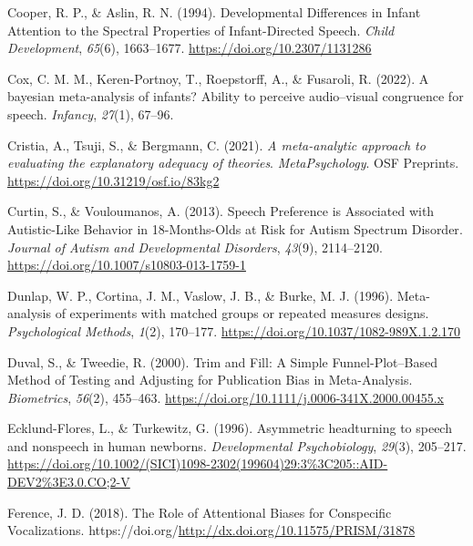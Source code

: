 \documentclass[
  man,mask,floatsintext]{apa6}
\newlength{\cslhangindent}
\newlength{\cslentryspacingunit} %
\newenvironment{CSLReferences}[2] %
 {%
  \setlength{\parindent}{0pt}
  \ifodd #1
  \let\oldpar\par
  \def\par{\hangindent=\cslhangindent\oldpar}
  \fi
  \setlength{\parskip}{#2\cslentryspacingunit}
 }%
 {}
\begin{document}
\begin{CSLReferences}{1}{0}
\leavevmode{}%
Cooper, R. P., \& Aslin, R. N. (1994). Developmental {Differences} in {Infant} {Attention} to the {Spectral} {Properties} of {Infant}-{Directed} {Speech}. \emph{Child Development}, \emph{65}(6), 1663--1677. \url{https://doi.org/10.2307/1131286}

\leavevmode{}%
Cox, C. M. M., Keren-Portnoy, T., Roepstorff, A., \& Fusaroli, R. (2022). A bayesian meta-analysis of infants? Ability to perceive audio--visual congruence for speech. \emph{Infancy}, \emph{27}(1), 67--96.

\leavevmode{}%
Cristia, A., Tsuji, S., \& Bergmann, C. (2021). \emph{A meta-analytic approach to evaluating the explanatory adequacy of theories}. \emph{MetaPsychology}. OSF Preprints. \url{https://doi.org/10.31219/osf.io/83kg2}

\leavevmode{}%
Curtin, S., \& Vouloumanos, A. (2013). Speech {Preference} is {Associated} with {Autistic}-{Like} {Behavior} in 18-{Months}-{Olds} at {Risk} for {Autism} {Spectrum} {Disorder}. \emph{Journal of Autism and Developmental Disorders}, \emph{43}(9), 2114--2120. \url{https://doi.org/10.1007/s10803-013-1759-1}

\leavevmode{}%
Dunlap, W. P., Cortina, J. M., Vaslow, J. B., \& Burke, M. J. (1996). Meta-analysis of experiments with matched groups or repeated measures designs. \emph{Psychological Methods}, \emph{1}(2), 170--177. \url{https://doi.org/10.1037/1082-989X.1.2.170}

\leavevmode{}%
Duval, S., \& Tweedie, R. (2000). Trim and {Fill}: {A} {Simple} {Funnel}-{Plot}--{Based} {Method} of {Testing} and {Adjusting} for {Publication} {Bias} in {Meta}-{Analysis}. \emph{Biometrics}, \emph{56}(2), 455--463. \url{https://doi.org/10.1111/j.0006-341X.2000.00455.x}

\leavevmode{}%
Ecklund-Flores, L., \& Turkewitz, G. (1996). Asymmetric headturning to speech and nonspeech in human newborns. \emph{Developmental Psychobiology}, \emph{29}(3), 205--217. \url{https://doi.org/10.1002/(SICI)1098-2302(199604)29:3\%3C205::AID-DEV2\%3E3.0.CO;2-V}

\leavevmode{}%
Ference, J. D. (2018). The {Role} of {Attentional} {Biases} for {Conspecific} {Vocalizations}. https://doi.org/\url{http://dx.doi.org/10.11575/PRISM/31878}


\end{CSLReferences}
\end{document}
